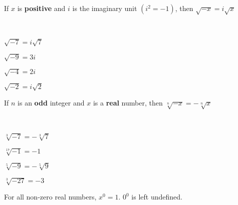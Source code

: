 \documentclass[crop=false,class=book,oneside]{standalone}
\begin{document}
            \begin{theorem}
                \label{thm:North_Shore_square_root_of_negative_real}
                If $x$ is \textbf{positive}
                and $i$ is the imaginary unit
                $(i^{2}=-1)$,
                then $\sqrt{-x}=i\sqrt{x}$
            \end{theorem}
            \begin{example}
                \
                \begin{enumerate}
                \end{enumerate}
            \end{example}
            \begin{theorem}
                \label{thm:North_Shore_odd_nth_root_of_real}
                If $n$ is an \textbf{odd} integer
                and $x$ is a \textbf{real} number,
                then $\sqrt[n]{-x}=-\sqrt[n]{x}$
            \end{theorem}
            \begin{example}
                \
                \begin{enumerate}
                    \begin{multicols}{4}
                    \item $\sqrt[3]{-7}=-\sqrt[3]{7}$
                    \item $\sqrt[17]{-1}=-1$
                    \item $\sqrt[5]{-9}=-\sqrt[5]{9}$
                    \item $\sqrt[3]{-27}=-3$
                    \end{multicols}
                \end{enumerate}
            \end{example}
            \begin{remark}
                \label{remark:North_Shore_non_zero_raised_to_zero}
                For all non-zero  real numbers, $x^{0}=1$.
                $0^0$ is left undefined.
            \end{remark}
\end{document}

